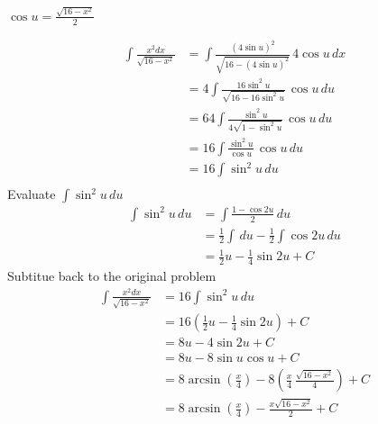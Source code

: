 \documentclass[12pt]{article}
\begin{document}
\begin{enumerate}
\begin{multicols}{2}
  $\cos u=\displaystyle\frac{\sqrt{16-x^{2}}}{2}$\\\break
\end{multicols}
\begin{equation}
  \begin{aligned}
  \int\frac{x^{2}dx}{\sqrt{16-x^{2}}}&=\int\frac{(4\sin u)^{2}}{\sqrt{16-(4\sin u)^{2}}}\,4\cos u\,dx\\
  &=4\int\frac{16\sin^{2}u}{\sqrt{16-16\sin^{2}u}}\,\cos u\,du\\
  &=64\int\frac{\sin^{2}u}{4\sqrt{1-\sin^{2}u}}\,\cos u\,du\\
  &=16\int\frac{\sin^{2}u}{\cos u}\,\cos u\,du\\
  &=16\int\sin^{2}u\,du\\  
  \end{aligned}
\end{equation}
Evaluate $\displaystyle\int\sin^{2}u\,du$
\begin{equation}
  \begin{aligned}
  \int\sin^{2}u\,du&=\int\frac{1-\cos{2u}}{2}\,du\\
  &=\frac{1}{2}\int\,du-\frac{1}{2}\int\cos{2u}\,du\\
  &=\frac{1}{2}u-\frac{1}{4}\sin{2u}+C
  \end{aligned}
\end{equation}
Subtitue back to the original problem
\begin{equation}
  \begin{aligned}
  \int\frac{x^{2}dx}{\sqrt{16-x^{2}}}&=16\int\sin^{2}u\,du\\
  &=16\left(\frac{1}{2}u-\frac{1}{4}\sin{2u}\right)+C\\
  &=8u-4\sin{2u}+C\\
  &=8u-8\sin{u}\cos{u}+C\\
  &=8\arcsin\left(\frac{x}{4}\right)-8\left(\frac{x}{4}\,\frac{\sqrt{16-x^{2}}}{4}\right)+C\\
  &=8\arcsin\left(\frac{x}{4}\right)-\frac{x\sqrt{16-x^{2}}}{2}+C
  \end{aligned}
\end{equation}
\end{enumerate}
\end{document}
